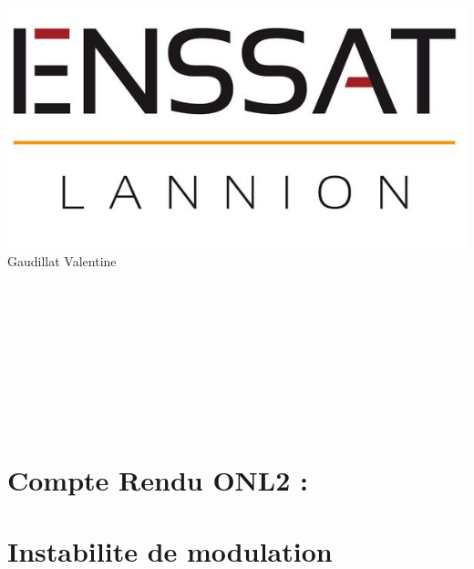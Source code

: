 \documentclass[a4paper,12pt,titlepage]{article}
\begin{document}
	
		
	 
	{\hfill \includegraphics[scale=0.15]{LogoENSSAT.jpg}}\\
	Gaudillat Valentine \\ 

    
    
	\begin{verbatim}
	
	
	
	
	
	

	

	\end{verbatim}
	{\centering \section*{Compte Rendu ONL2 :} \section*{Instabilite de modulation}}
	\begin{verbatim}
	
	
	
	
	\end{verbatim}
	
	\begin{center}
	\end{center}
		
		
		
		
		
		
		
		
		
		
		
		
	
	\clearpage
	\tableofcontents 
	\newpage
    
\end{document}
